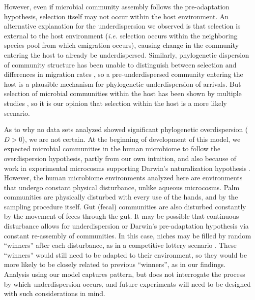 \documentclass{article}
\begin{document}
\par
However, even if microbial community assembly follows the pre-adaptation hypothesis, selection itself may not occur within the host environment. An alternative explanation for the underdispersion we observed is that selection is external to the host environment (\emph{i.e.} selection occurs within the neighboring species pool from which emigration occurs), causing change in the community entering the host to already be underdispersed. Similarly, phylogenetic dispersion of community structure has been unable to distinguish between selection and differences in migration rates \cite{Emerson2008}, so a pre-underdispersed community entering the host is a plausible mechanism for phylogenetic underdispersion of arrivals. But selection of microbial communities within the host has been shown by multiple studies \cite{Peterfreund2012,David2014,Kennedy2016}, so it is our opinion that selection within the host is a more likely scenario.
\par
As to why no data sets analyzed showed significant phylogenetic overdispersion (\(D > 0\)), we are not certain. At the beginning of development of this model, we expected microbial communities in the human microbiome to follow the overdispersion hypothesis, partly from our own intuition, and also because of work in experimental microcosms supporting Darwin’s naturalization hypothesis \cite{Peay2012}. However, the human microbiome environments analyzed here are environments that undergo constant physical disturbance, unlike aqueous microcosms. Palm communities are physically disturbed with every use of the hands, and by the sampling procedure itself. Gut (fecal) communities are also disturbed constantly by the movement of feces through the gut. It may be possible that continuous disturbance allows for underdispersion or Darwin’s pre-adaptation hypothesis via constant re-assembly of communities. In this case, niches may be filled by random “winners” after each disturbance, as in a competitive lottery scenario \cite{Verster2018}. These “winners” would still need to be adapted to their environment, so they would be more likely to be closely related to previous “winners”, as in our findings. Analysis using our model captures pattern, but does not interrogate the process by which underdispersion occurs, and future experiments will need to be designed with such considerations in mind.
\par
\end{document}
